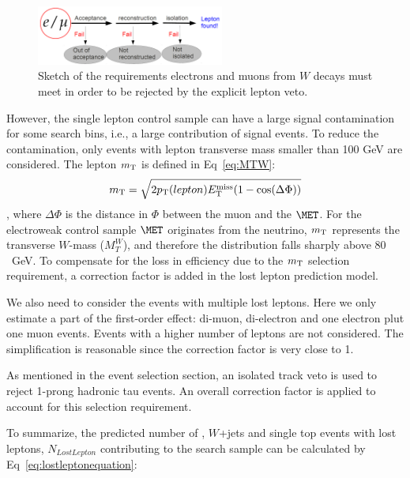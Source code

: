 \begin{figure}[htbp]
\begin{center}
\includegraphics[width=0.55\textwidth]{sections/mc4/Backgrounds/LostLepton/figures/lepton_veto_sketch.png}
\end{center}
\caption{Sketch of the requirements electrons and muons from $W$ decays must meet in order to be rejected by the explicit lepton veto.}
\label{fig:llmethod}
\end{figure}

However, the single lepton control sample can have a large signal contamination for some search bins, i.e., a large contribution of signal events. To reduce the contamination, only events with lepton transverse mass smaller than 100 GeV are considered. The lepton $m_{\rm T}$ is defined in Eq~\ref{eq:MTW}:
\begin{equation}
m_{\rm T} = \sqrt{2 p_{\rm T}(lepton) E^{\rm miss}_{\rm T} (1 - \cos(\Delta \Phi))}
\label{eq:MTW}
\end{equation}
, where $\Delta \Phi$ is the distance in $\Phi$ between the muon and the $\MET$. For the electroweak control sample $\MET$ originates from the neutrino, $m_{\rm T}$ represents the transverse $W$-mass ($M_{T}^{W}$), and therefore the distribution falls sharply above $80$~GeV. To compensate for the loss in efficiency due to the $m_{\rm T}$ selection requirement, a correction factor is added in the lost lepton prediction model. 

We also need to consider the events with multiple lost leptons. Here we only estimate a part of the first-order effect: di-muon, di-electron and one electron plut one muon events. Events with a higher number of leptons are not considered. The simplification is reasonable since the correction factor is very close to 1.

As mentioned in the event selection section, an isolated track veto is used to reject 1-prong hadronic tau events. An overall correction factor is applied to account for this selection requirement. 

To summarize, the predicted number of \ttbar, $W$+jets and single top events with lost leptons, $N_{LostLepton}$ contributing to the search sample can be calculated by Eq~\ref{eq:lostleptonequation}:

